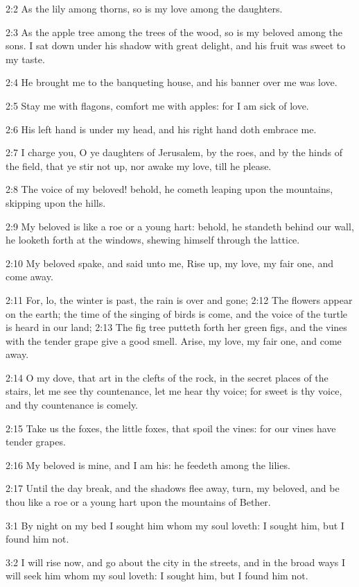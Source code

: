 2:2 As the lily among thorns, so is my love among the daughters.

2:3 As the apple tree among the trees of the wood, so is my beloved among the sons. I sat down under his shadow with great delight, and his fruit was sweet to my taste.

2:4 He brought me to the banqueting house, and his banner over me was love.

2:5 Stay me with flagons, comfort me with apples: for I am sick of love.

2:6 His left hand is under my head, and his right hand doth embrace me.

2:7 I charge you, O ye daughters of Jerusalem, by the roes, and by the hinds of the field, that ye stir not up, nor awake my love, till he please.

2:8 The voice of my beloved! behold, he cometh leaping upon the mountains, skipping upon the hills.

2:9 My beloved is like a roe or a young hart: behold, he standeth behind our wall, he looketh forth at the windows, shewing himself through the lattice.

2:10 My beloved spake, and said unto me, Rise up, my love, my fair one, and come away.

2:11 For, lo, the winter is past, the rain is over and gone; 2:12 The flowers appear on the earth; the time of the singing of birds is come, and the voice of the turtle is heard in our land; 2:13 The fig tree putteth forth her green figs, and the vines with the tender grape give a good smell. Arise, my love, my fair one, and come away.

2:14 O my dove, that art in the clefts of the rock, in the secret places of the stairs, let me see thy countenance, let me hear thy voice; for sweet is thy voice, and thy countenance is comely.

2:15 Take us the foxes, the little foxes, that spoil the vines: for our vines have tender grapes.

2:16 My beloved is mine, and I am his: he feedeth among the lilies.

2:17 Until the day break, and the shadows flee away, turn, my beloved, and be thou like a roe or a young hart upon the mountains of Bether.

3:1 By night on my bed I sought him whom my soul loveth: I sought him, but I found him not.

3:2 I will rise now, and go about the city in the streets, and in the broad ways I will seek him whom my soul loveth: I sought him, but I found him not.

